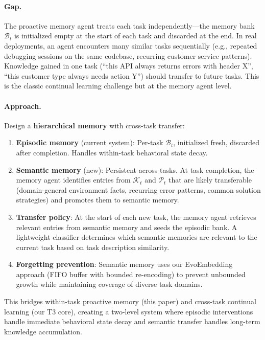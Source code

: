 \documentclass[11pt,a4paper]{article}
\begin{document}
\paragraph{Gap.} The proactive memory agent treats each task independently---the memory bank $\mathcal{B}_t$ is initialized empty at the start of each task and discarded at the end. In real deployments, an agent encounters many similar tasks sequentially (e.g., repeated debugging sessions on the same codebase, recurring customer service patterns). Knowledge gained in one task (``this API always returns errors with header X'', ``this customer type always needs action Y'') should transfer to future tasks. This is the classic continual learning challenge but at the memory agent level.

\paragraph{Approach.} Design a \textbf{hierarchical memory} with cross-task transfer:
\begin{enumerate}
\item \textbf{Episodic memory} (current system): Per-task $\mathcal{B}_t$, initialized fresh, discarded after completion. Handles within-task behavioral state decay.
\item \textbf{Semantic memory} (new): Persistent across tasks. At task completion, the memory agent identifies entries from $\mathcal{K}_t$ and $\mathcal{P}_t$ that are likely transferable (domain-general environment facts, recurring error patterns, common solution strategies) and promotes them to semantic memory.
\item \textbf{Transfer policy}: At the start of each new task, the memory agent retrieves relevant entries from semantic memory and seeds the episodic bank. A lightweight classifier determines which semantic memories are relevant to the current task based on task description similarity.
\item \textbf{Forgetting prevention}: Semantic memory uses our EvoEmbedding~\cite{evoembedding2026} approach (FIFO buffer with bounded re-encoding) to prevent unbounded growth while maintaining coverage of diverse task domains.
\end{enumerate}
This bridges within-task proactive memory (this paper) and cross-task continual learning (our T3 core), creating a two-level system where episodic interventions handle immediate behavioral state decay and semantic transfer handles long-term knowledge accumulation.
\end{document}
